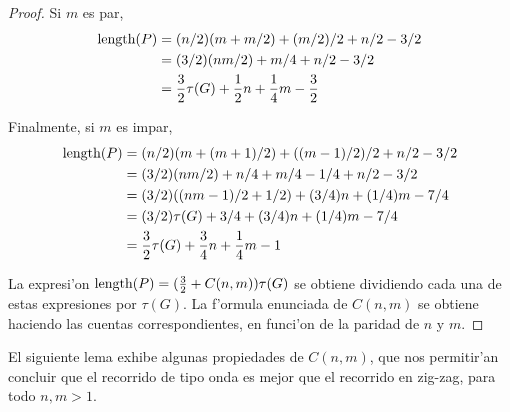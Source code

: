 \begin{theorem}
\begin{proof}
\noindent
Si $m$ es par,
\begin{align*}
\textnormal{length}(P) &= (n / 2)(m + m / 2) + (m / 2) / 2 + n / 2 - 3 / 2\\
&= (3 / 2)(nm / 2) + m / 4 + n / 2 - 3 / 2\\
&= \frac{3}{2} \tau(G) + \frac{1}{2} n + \frac{1}{4} m - \frac{3}{2}
\end{align*}

\noindent
Finalmente, si $m$ es impar,
\begin{align*}
\textnormal{length}(P) &= (n / 2)(m + (m + 1) / 2) + ((m - 1) / 2) / 2 + n / 2 - 3 / 2\\
&= (3 / 2)(nm / 2) + n / 4 + m / 4 - 1 / 4 + n / 2 - 3 / 2\\
&= (3 / 2) ((nm - 1) / 2 + 1 / 2) + (3 / 4)n + (1 / 4)m  - 7 / 4\\
&= (3 / 2) \tau(G) + 3 / 4 + (3 / 4)n + (1 / 4)m - 7 / 4\\
&= \frac{3}{2} \tau(G) + \frac{3}{4} n + \frac{1}{4} m - 1
\end{align*}

La expresi'on $\textnormal{length}(P) = (\frac{3}{2} + C(n, m)) \tau(G)$ se obtiene dividiendo cada una de estas expresiones por $\tau(G)$. La f'ormula enunciada de $C(n, m)$ se obtiene haciendo las cuentas correspondientes, en funci'on de la paridad de $n$ y $m$.
\end{proof}
\end{theorem}

El siguiente lema exhibe algunas propiedades de $C(n, m)$, que nos permitir'an concluir que el recorrido de tipo onda es mejor que el recorrido en zig-zag, para todo $n, m > 1$.

